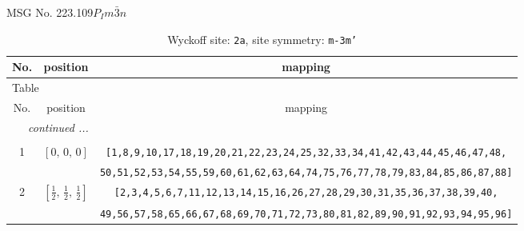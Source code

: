 \documentclass[fleqn,8pt]{jsarticle}
\begin{document}
\setcounter{MaxMatrixCols}{32}

\renewcommand{\tablename}{Table~}
\renewcommand{\figurename}{Figure~}
\begin{center}
\LARGE
MSG No. 223.109\quad$P_{I}m\bar{3}n$
\end{center}
\renewcommand{\arraystretch}{1.2}
\begin{longtable}{ccc}
\caption{Wyckoff site: {\tt 2a}, site symmetry: {\tt m-3m'}}
 \\
 \hline \hline
No. & position & mapping \\ \hline \endfirsthead

\multicolumn{2}{l}{\tablename\ \thetable{}} \\
 \hline \hline
No. & position & mapping \\ \hline \endhead

 \hline \hline
\multicolumn{2}{r}{\footnotesize\it continued ...} \\ \endfoot

 \hline \hline
\multicolumn{2}{r}{} \\ \endlastfoot

1 & $\left[ 0,\, 0,\, 0 \right]$ & {\tt [1,8,9,10,17,18,19,20,21,22,23,24,25,32,33,34,41,42,43,44,45,46,47,48,} \\ \hline
 &  & {\tt 50,51,52,53,54,55,59,60,61,62,63,64,74,75,76,77,78,79,83,84,85,86,87,88]} \\ \hline
2 & $\left[ \frac{1}{2},\, \frac{1}{2},\, \frac{1}{2} \right]$ & {\tt [2,3,4,5,6,7,11,12,13,14,15,16,26,27,28,29,30,31,35,36,37,38,39,40,} \\ \hline
 &  & {\tt 49,56,57,58,65,66,67,68,69,70,71,72,73,80,81,82,89,90,91,92,93,94,95,96]} \\
\end{longtable}
\renewcommand{\arraystretch}{1.2}
\end{document}
